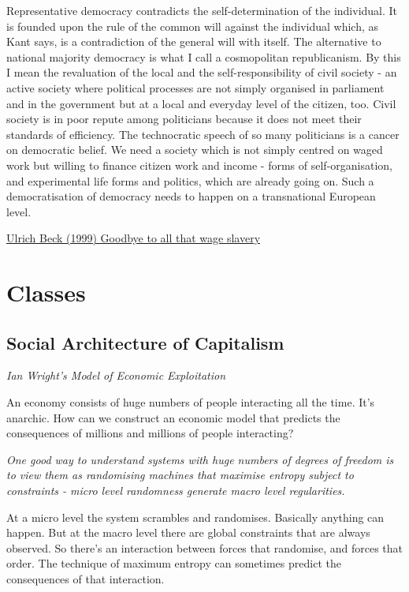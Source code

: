 \documentclass[
]{book}
\begin{document}
Representative democracy contradicts the self-determination of the individual. It is founded upon the rule of the common will against the individual which, as Kant says, is a contradiction of the general will with itself. The alternative to national majority democracy is what I call a cosmopolitan republicanism. By this I mean the revaluation of the local and the self-responsibility of civil society - an active society where political processes are not simply organised in parliament and in the government but at a local and everyday level of the citizen, too. Civil society is in poor repute among politicians because it does not meet their standards of efficiency. The technocratic speech of so many politicians is a cancer on democratic belief. We need a society which is not simply centred on waged work but willing to finance citizen work and income - forms of self-organisation, and experimental life forms and politics, which are already going on. Such a democratisation of democracy needs to happen on a transnational European level.

\href{https://www.newstatesman.com/node/148758}{Ulrich Beck (1999) Goodbye to all that wage slavery}

\hypertarget{classes}{%
\chapter{Classes}\label{classes}}

\hypertarget{social-architecture-of-capitalism}{%
\section{Social Architecture of Capitalism}\label{social-architecture-of-capitalism}}

\emph{Ian Wright's Model of Economic Exploitation}

An economy consists of huge numbers of people interacting all the time.
It's anarchic.
How can we construct an economic model that predicts
the consequences of millions and millions of people interacting?

\emph{One good way to understand systems with huge numbers of degrees of freedom is to view them as randomising machines that maximise entropy subject to constraints -
micro level randomness generate macro level regularities.}

At a micro level the system scrambles and randomises.
Basically anything can happen.
But at the macro level there are global constraints that are always observed.
So there's an interaction between forces that randomise, and forces that order.
The technique of maximum entropy can sometimes predict the consequences of that interaction.
\end{document}
